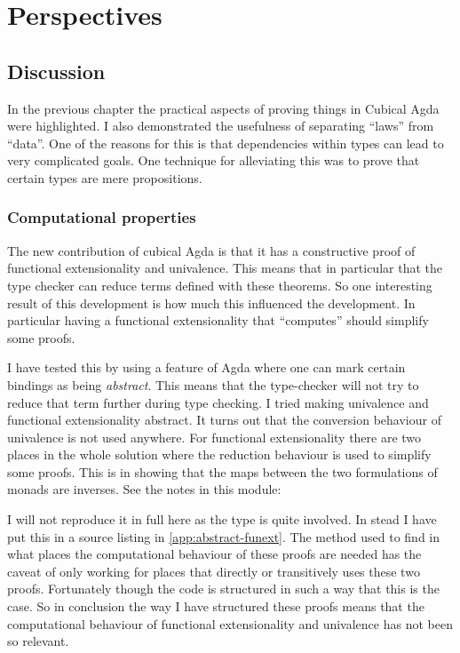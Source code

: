 \chapter{Perspectives}
\section{Discussion}
In the previous chapter the practical aspects of proving things in
Cubical Agda were highlighted.  I also demonstrated the usefulness of
separating ``laws'' from ``data''.  One of the reasons for this is that
dependencies within types can lead to very complicated goals.  One
technique for alleviating this was to prove that certain types are
mere propositions.

\subsection{Computational properties}
The new contribution of cubical Agda is that it has a constructive
proof of functional extensionality
and univalence.  This means that in particular that
the type checker can reduce terms defined with these theorems.  So one
interesting result of this development is how much this influenced the
development.  In particular having a functional extensionality that
``computes'' should simplify some proofs.

I have tested this by using a feature of Agda where one can mark
certain bindings as being \emph{abstract}.  This means that the
type-checker will not try to reduce that term further during type
checking.  I tried making univalence and functional extensionality
abstract.  It turns out that the conversion behaviour of univalence is
not used anywhere.  For functional extensionality there are two places
in the whole solution where the reduction behaviour is used to
simplify some proofs.  This is in showing that the maps between the
two formulations of monads are inverses.  See the notes in this
module:
%
\begin{center}
\end{center}
%

I will not reproduce it in full here as the type is quite involved. In
stead I have put this in a source listing in \ref{app:abstract-funext}.
The method used to find in what places the computational behaviour of
these proofs are needed has the caveat of only working for places that
directly or transitively uses these two proofs.  Fortunately though
the code is structured in such a way that this is the case. So in
conclusion the way I have structured these proofs means that the
computational behaviour of functional extensionality and univalence
has not been so relevant.

